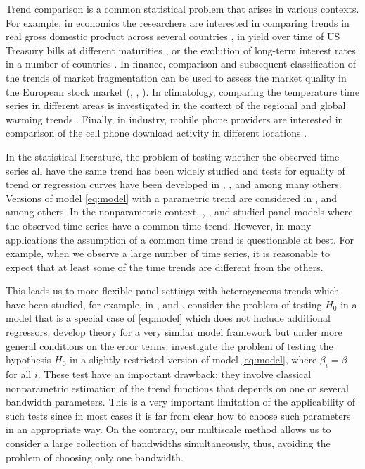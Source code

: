 \documentclass[a4paper,12pt]{article}
\begin{document}
Trend comparison is a common statistical problem that arises in various contexts. For example, in economics the researchers are interested in comparing trends in real gross domestic product across several countries \citep[][]{Grier1989}, in yield over time of US Treasury bills at different maturities \citep[][]{Park2009}, or the evolution of long-term interest rates in a number of countries \citep[][]{Christiansen1997}. In finance, comparison and subsequent classification of the trends of market fragmentation can be used to assess the market quality in the European stock market (\citeauthor{VogtLinton2017}, \citeyear{VogtLinton2017}, \citeyear{VogtLinton2020}). In climatology, comparing the temperature time series in different areas is investigated in the context of the regional and global warming trends   \citep[][]{KarolyWu2005}. Finally, in industry, mobile phone providers are interested in comparison of the cell phone download activity in different locations \citep[][]{DegrasWu2012}.


In the statistical literature, the problem of testing whether the observed time series all have the same trend  has been widely studied and tests for equality of trend or regression curves have been developed in \cite{HaerdleMarron1990}, \cite{Hall1990}, \cite{Delgado1993} and \cite{DegrasWu2012} among many others. Versions of \linebreak model \eqref{eq:model} with a parametric trend are considered in \cite{Vogelsang2005}, \cite{Sun2011} and \cite{Xu2012} among others. In the nonparametric context, \cite{LiChenGao2010}, \cite{Atak2011}, \cite{Robinson2012} and \cite{ChenGaoLi2012} studied panel models where the observed time series have a common time trend. However, in many applications the assumption of a common time trend is questionable at best. For example, when we observe a large number of time series, it is reasonable to expect that at least some of the time trends are different from the others. 

This leads us to more flexible panel settings with heterogeneous trends which have been studied, for example, in \cite{DegrasWu2012},  \cite{Zhang2012} and \cite{Hidalgo2014}. \cite{DegrasWu2012} consider the problem of testing $H_0$ in a model that is a special case of \eqref{eq:model} which does not include additional regressors. \cite{ChenWu2018} develop theory for a very similar model framework but under more general conditions on the error terms. \cite{Zhang2012} investigate the problem of testing the hypothesis $H_0$ in a slightly restricted version of model \eqref{eq:model}, where $\beta_i = \beta$ for all $i$. These test have an important drawback: they involve classical nonparametric estimation of the trend functions that depends on one or several bandwidth parameters. This is a very important limitation of the applicability of such tests since in most cases it is far from clear how to choose such parameters in an appropriate way. On the contrary, our multiscale method allows us to consider a large collection of bandwidths simultaneously, thus, avoiding the problem of choosing only one bandwidth.
\end{document}
